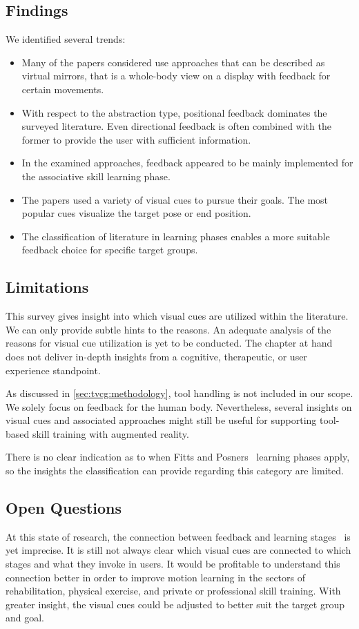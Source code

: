 \subsection{Findings}
We identified several trends:
\begin{itemize}
    \item Many of the papers considered use approaches that can be described as virtual mirrors, that is a whole-body view on a display with feedback for certain movements.
    \item  With respect to the abstraction type, positional feedback dominates the surveyed literature. Even directional feedback is often combined with the former to provide the user with sufficient information.
    \item In the examined approaches, feedback appeared to be mainly implemented for the associative skill learning phase.
    \item The papers used a variety of visual cues to pursue their goals. The most popular cues visualize the target pose or end position.
    \item The classification of literature in learning phases enables a more suitable feedback choice for specific target groups.
\end{itemize}

\subsection{Limitations}
This survey gives insight into which visual cues are utilized within the literature. We can only provide subtle hints to the reasons. An adequate analysis of the reasons for visual cue utilization is yet to be conducted. The chapter at hand does not deliver in-depth insights from a cognitive, therapeutic, or user experience standpoint.

As discussed in \autoref{sec:tvcg:methodology}, tool handling is not included in our scope. We solely focus on feedback for the human body. Nevertheless, several insights on visual cues and associated approaches might still be useful for supporting tool-based skill training with augmented reality.

There is no clear indication as to when Fitts and Posners~\cite{fitts1967HPe} learning phases apply, so the insights the classification can provide regarding this category are limited.

\subsection{Open Questions \label{sec:futureWork}}
At this state of research, the connection between feedback and learning stages~\cite{fitts1967HPe} is yet imprecise. It is still not always clear which visual cues are connected to which stages and what they invoke in users. It would be profitable to understand this connection better in order to improve motion learning in the sectors of rehabilitation, physical exercise, and private or professional skill training. With greater insight, the visual cues could be adjusted to better suit the target group and goal.

